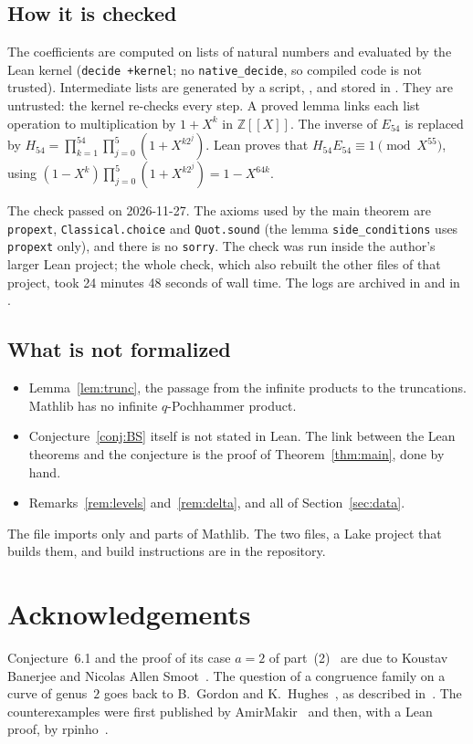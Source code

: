 \documentclass[11pt]{amsart}
\theoremstyle{definition}
\theoremstyle{remark}
\newcommand{\Z}{\mathbb{Z}}
\begin{document}
\subsection*{How it is checked}
The coefficients are computed on lists of natural numbers and evaluated by the Lean kernel (\texttt{decide +kernel}; no \texttt{native\_decide}, so compiled code is not trusted). Intermediate lists are generated by a script, , and stored in . They are untrusted: the kernel re-checks every step. A proved lemma links each list operation to multiplication by \(1+X^k\) in \(\Z[[X]]\). The inverse of \(E_{54}\) is replaced by \(H_{54}=\prod_{k=1}^{54}\prod_{j=0}^{5}(1+X^{k2^j})\). Lean proves that \(H_{54}E_{54}\equiv1\pmod{X^{55}}\), using \((1-X^k)\prod_{j=0}^{5}(1+X^{k2^j})=1-X^{64k}\).

The check passed on 2026-11-27. The axioms used by the main theorem are \texttt{propext}, \texttt{Classical.choice} and \texttt{Quot.sound} (the lemma \texttt{side\_conditions} uses \texttt{propext} only), and there is no \texttt{sorry}. The check was run inside the author's larger Lean project; the whole check, which also rebuilt the other files of that project, took 24 minutes 48 seconds of wall time. The logs are archived in  and in .

\subsection*{What is not formalized}
\begin{itemize}
\item Lemma~\ref{lem:trunc}, the passage from the infinite products to the truncations. Mathlib has no infinite \(q\)-Pochhammer product.
\item Conjecture~\ref{conj:BS} itself is not stated in Lean. The link between the Lean theorems and the conjecture is the proof of Theorem~\ref{thm:main}, done by hand.
\item Remarks~\ref{rem:levels} and~\ref{rem:delta}, and all of Section~\ref{sec:data}.
\end{itemize}
The file  imports only  and parts of Mathlib. The two files, a Lake project that builds them, and build instructions are in the repository.

\section*{Acknowledgements}
Conjecture~6.1 and the proof of its case \(a=2\) of part~(2)~\cite[Thm.~1.1]{BS} are due to Koustav Banerjee and Nicolas Allen Smoot~\cite{BS}. The question of a congruence family on a curve of genus~\(2\) goes back to B.~Gordon and K.~Hughes~\cite{GH}, as described in~\cite{BS}. The counterexamples were first published by AmirMakir~\cite{AM} and then, with a Lean proof, by rpinho~\cite{RP}.
\end{document}
